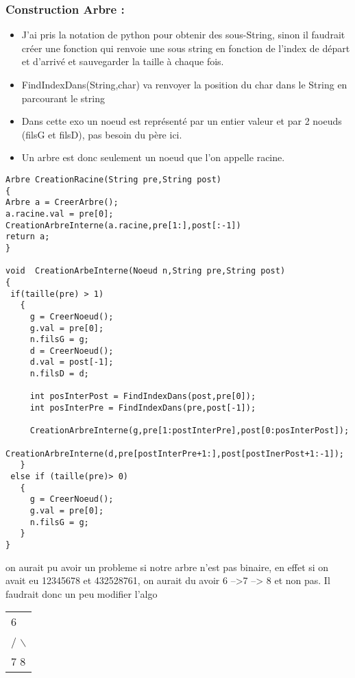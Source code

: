 \documentclass[11pt]{article}
\begin{document}
\subsubsection{Construction Arbre :}
\label{sec:orgb6dfd60}
\begin{itemize}
\item J'ai pris la notation de python pour obtenir des sous-String, sinon il faudrait créer une fonction qui renvoie une sous string en fonction de l'index de départ et d'arrivé et sauvegarder la taille à chaque fois.
\item FindIndexDans(String,char) va renvoyer la position du char dans le String en parcourant le string
\item Dans cette exo un noeud est représenté par un entier valeur et par 2 noeuds (filsG et filsD), pas besoin du père ici.
\item Un arbre est donc seulement un noeud que l'on appelle racine.
\end{itemize}
\begin{lstlisting}
Arbre CreationRacine(String pre,String post)
{
Arbre a = CreerArbre();
a.racine.val = pre[0];
CreationArbreInterne(a.racine,pre[1:],post[:-1])
return a;
}

void  CreationArbeInterne(Noeud n,String pre,String post)
{
 if(taille(pre) > 1)
   {
     g = CreerNoeud();
     g.val = pre[0];
     n.filsG = g;
     d = CreerNoeud();
     d.val = post[-1];
     n.filsD = d;

     int posInterPost = FindIndexDans(post,pre[0]);
     int posInterPre = FindIndexDans(pre,post[-1]);

     CreationArbreInterne(g,pre[1:postInterPre],post[0:posInterPost]);
     CreationArbreInterne(d,pre[postInterPre+1:],post[postInerPost+1:-1]);
   }
 else if (taille(pre)> 0)
   {
     g = CreerNoeud();
     g.val = pre[0];
     n.filsG = g;
   }
}
\end{lstlisting}

on aurait pu avoir un probleme si notre arbre n'est pas binaire, en effet si on avait eu 12345678 et 432528761, on aurait du avoir 6 -->7 --> 8 et non pas. Il faudrait donc un peu modifier l'algo
\begin{center}
\begin{tabular}{|l|}
\hline
6 \\
/ $\backslash$ \\
7   8 \\
\hline
\end{tabular}
\end{center}
\end{document}

